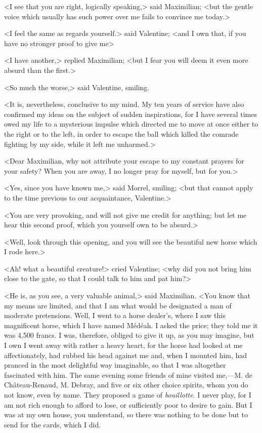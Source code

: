  <I see that you are right, logically speaking,> said Maximilian; <but the gentle voice which usually has such power over me fails to convince me today.> 

 <I feel the same as regards yourself.> said Valentine; <and I own that, if you have no stronger proof to give me\longdash> 

 <I have another,> replied Maximilian; <but I fear you will deem it even more absurd than the first.> 

 <So much the worse,> said Valentine, smiling. 

 <It is, nevertheless, conclusive to my mind. My ten years of service have also confirmed my ideas on the subject of sudden inspirations, for I have several times owed my life to a mysterious impulse which directed me to move at once either to the right or to the left, in order to escape the ball which killed the comrade fighting by my side, while it left me unharmed.> 

 <Dear Maximilian, why not attribute your escape to my constant prayers for your safety? When you are away, I no longer pray for myself, but for you.>

<Yes, since you have known me,> said Morrel, smiling; <but that cannot apply to the time previous to our acquaintance, Valentine.> 

 <You are very provoking, and will not give me credit for anything; but let me hear this second proof, which you yourself own to be absurd.> 

 <Well, look through this opening, and you will see the beautiful new horse which I rode here.> 

 <Ah! what a beautiful creature!> cried Valentine; <why did you not bring him close to the gate, so that I could talk to him and pat him?> 

 <He is, as you see, a very valuable animal,> said Maximilian. <You know that my means are limited, and that I am what would be designated a man of moderate pretensions. Well, I went to a horse dealer's, where I saw this magnificent horse, which I have named Médéah. I asked the price; they told me it was 4,500 francs. I was, therefore, obliged to give it up, as you may imagine, but I own I went away with rather a heavy heart, for the horse had looked at me affectionately, had rubbed his head against me and, when I mounted him, had pranced in the most delightful way imaginable, so that I was altogether fascinated with him. The same evening some friends of mine visited me,—M. de Château-Renaud, M. Debray, and five or six other choice spirits, whom you do not know, even by name. They proposed a game of \textit{bouillotte}. I never play, for I am not rich enough to afford to lose, or sufficiently poor to desire to gain. But I was at my own house, you understand, so there was nothing to be done but to send for the cards, which I did. 

